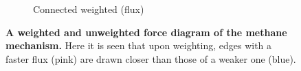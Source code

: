 \begin{figure}[H]
\begin{subfigure}[b]{.4\textwidth}
     \caption{Connected weighted (flux)}
     \end{subfigure}
        \caption{\textbf{A weighted and unweighted force diagram of the methane mechanism.} Here it is seen that upon weighting, edges with a faster flux (pink) are drawn closer than those of a weaker one (blue).}
      \label{fig:resmeth}
\end{figure}
% 
% 
% 
% 
% 
% 
